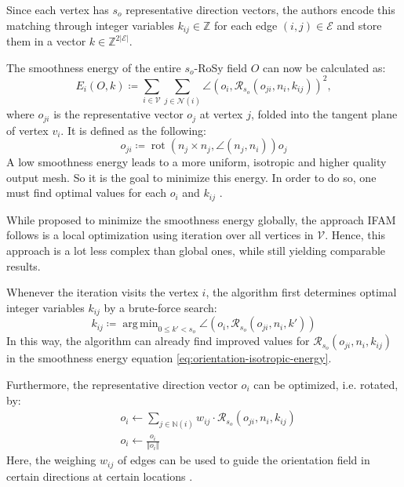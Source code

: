 \documentclass{ACGSeminar}
\DeclareMathOperator{\rot}{rot}
\DeclareMathOperator*{\argmin}{arg\,min}
\begin{document}
Since each vertex has $s_o$ representative direction vectors, the authors encode this matching through integer variables $k_{ij} \in \mathbb{Z}$ for each edge $(i,j) \in \mathcal{E}$ and store them in a vector $k \in \mathbb{Z}^{2 \vert \mathcal{E} \vert}$.

The smoothness energy of the entire $s_o$-RoSy field $O$ can now be calculated as:
\begin{equation}\label{eq:orientation-isotropic-energy}
	E_i(O,k) \coloneqq \sum_{i \in \mathcal{V}} \sum_{j \in \mathcal{N}(i)} \angle(o_i, \mathcal{R}_{s_o}(o_{ji}, n_i, k_{ij}))^2,
\end{equation}
where $o_{ji}$ is the representative vector $o_j$ at vertex $j$, folded into the tangent plane of vertex $v_i$. It is defined as the following:
\begin{equation*}
	o_{ji} \coloneqq \rot(n_j \times n_j, \angle(n_j, n_i))o_j
\end{equation*}
A low smoothness energy leads to a more uniform, isotropic and higher quality output mesh. So it is the goal to minimize this energy. In order to do so, one must find optimal values for each $o_i$ and $k_{ij}$ \cite{jakob2015instant}.\bigskip

While \cite{bommes2009mixed} proposed to minimize the smoothness energy globally, the approach IFAM follows is a local optimization using iteration over all vertices in $\mathcal{V}$. Hence, this approach is a lot less complex than global ones, while still yielding comparable results.

Whenever the iteration visits the vertex $i$, the algorithm first determines optimal integer variables $k_{ij}$ by a brute-force search:
\begin{equation}\label{eq:orientation-intrinsic-integer}
	k_{ij} \coloneqq \argmin_{0 \leq k' < s_o} \angle(o_i, \mathcal{R}_{s_o}(o_{ji}, n_i, k'))
\end{equation}
In this way, the algorithm can already find improved values for $\mathcal{R}_{s_o}(o_{ji}, n_i, k_{ij})$ in the smoothness energy equation \eqref{eq:orientation-isotropic-energy}.

Furthermore, the representative direction vector $o_i$ can be optimized, i.e. rotated, by:
\begin{equation}\label{eq:orientation-intrinsic-vector}
\begin{split}
	& o_i \leftarrow \sum_{j \in \mathbb{N}(i)} w_{ij} \cdot \mathcal{R}_{s_o}(o_{ji}, n_i, k_{ij})\\
	& o_i \leftarrow \frac{o_i}{\Vert o_i \Vert}
\end{split}
\end{equation}
Here, the weighing $w_{ij}$ of edges can be used to guide the orientation field in certain directions at certain locations \cite{jakob2015instant}.\bigskip
\end{document}
